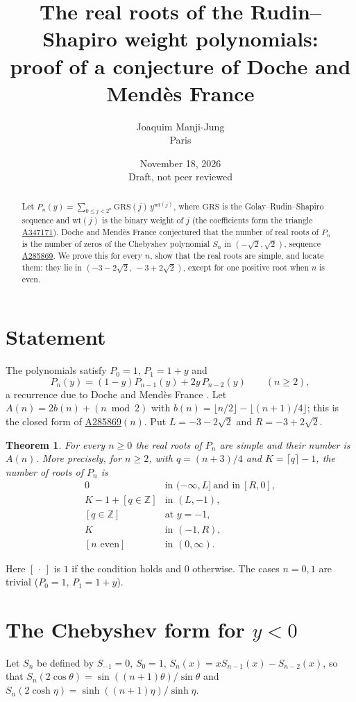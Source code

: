 \documentclass[11pt]{article}
\title{The real roots of the Rudin--Shapiro weight polynomials:\\ proof of a conjecture of Doche and Mend\`es France}
\author{Joaquim Manji-Jung\\ Paris}
\date{November 18, 2026\\[2pt] {\small Draft, not peer reviewed}}
\newtheorem{theorem}{Theorem}
\theoremstyle{remark}\newtheorem{remark}[theorem]{Remark}
\newcommand{\oeis}[1]{\href{https://oeis.org/#1}{#1}}
\begin{document}
\maketitle

\begin{abstract}
Let $P_n(y)=\sum_{0\le j<2^n}\mathrm{GRS}(j)\,y^{\mathrm{wt}(j)}$, where $\mathrm{GRS}$ is the
Golay--Rudin--Shapiro sequence and $\mathrm{wt}(j)$ is the binary weight of $j$ (the coefficients form the
triangle \oeis{A347171}). Doche and Mend\`es France conjectured that the number of real roots of $P_n$ is
the number of zeros of the Chebyshev polynomial $S_n$ in $(-\sqrt2,\sqrt2)$, sequence \oeis{A285869}.
We prove this for every $n$, show that the real roots are simple, and locate them: they lie in
$(-3-2\sqrt2,\,-3+2\sqrt2)$, except for one positive root when $n$ is even.
\end{abstract}

\section{Statement}
The polynomials satisfy $P_0=1$, $P_1=1+y$ and
\begin{equation}\label{rec}
P_n(y)=(1-y)P_{n-1}(y)+2y\,P_{n-2}(y)\qquad(n\ge2),
\end{equation}
a recurrence due to Doche and Mend\`es France \cite{DMF}. Let
$A(n)=2b(n)+(n \bmod 2)$ with $b(n)=\lfloor n/2\rfloor-\lfloor (n+1)/4\rfloor$; this is the closed form of
\oeis{A285869}$(n)$. Put $L=-3-2\sqrt2$ and $R=-3+2\sqrt2$.

\begin{theorem}\label{main}
For every $n\ge0$ the real roots of $P_n$ are simple and their number is $A(n)$. More precisely, for
$n\ge2$, with $q=(n+3)/4$ and $K=\lceil q\rceil-1$, the number of roots of $P_n$ is
\[
\begin{array}{ll}
0 & \text{in } (-\infty,L]\ \text{and in}\ [R,0],\\
K-1+[q\in\mathbb Z] & \text{in } (L,-1),\\
{}[q\in\mathbb Z] & \text{at } y=-1,\\
K & \text{in } (-1,R),\\
{}[n \text{ even}] & \text{in } (0,\infty).
\end{array}
\]
\end{theorem}
\noindent Here $[\,\cdot\,]$ is $1$ if the condition holds and $0$ otherwise. The cases $n=0,1$ are trivial
($P_0=1$, $P_1=1+y$).

\section{The Chebyshev form for $y<0$}
Let $S_n$ be defined by $S_{-1}=0$, $S_0=1$, $S_n(x)=xS_{n-1}(x)-S_{n-2}(x)$, so that
$S_n(2\cos\theta)=\sin((n+1)\theta)/\sin\theta$ and $S_n(2\cosh\eta)=\sinh((n+1)\eta)/\sinh\eta$.
\end{document}
